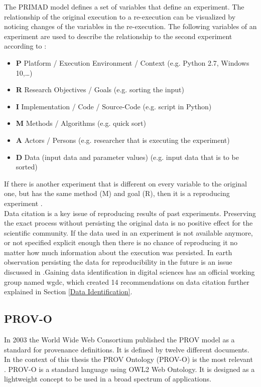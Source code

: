 \documentclass[draft,final]{vutinfth} %
\begin{document}
The PRIMAD model defines a set of variables that define an experiment. The relationship of the original execution to a re-execution can be visualized by noticing changes of the variables in the re-execution. The following variables of an experiment are used to describe the relationship to the second experiment according to \cite{primad}:

\begin{itemize}
	\item \textbf{P} Platform / Execution Environment / Context (e.g. Python 2.7, Windows 10,\dots) \\
	\item \textbf{R} Research Objectives / Goals (e.g. sorting the input) \\
	\item \textbf{I} Implementation / Code / Source-Code (e.g. script in Python) \\
	\item \textbf{M} Methods / Algorithms (e.g. quick sort) \\
	\item \textbf{A} Actors / Persons (e.g. researcher that is executing the experiment) \\
	\item \textbf{D} Data (input data and parameter values)   (e.g. input data that is to be sorted) 
\end{itemize}
If there is another experiment that is different on every variable to the original one, but has the same method (M) and goal (R), then it is a reproducing experiment \cite{primad}. 
\\  
Data citation is a key issue of reproducing results of past experiments. Preserving the exact process without persisting the original data is no positive effect for the scientific community. If the data used in an experiment is not available anymore, or not specified explicit enough then there is no chance of reproducing it no matter how much information about the execution was persisted. In earth observation persisting the data for reproducibility in the future is an issue discussed in \cite{6352411}.Gaining data identification in digital sciences has an official working group named \gls{wgdc}, which created 14 recommendations on data citation further explained in Section \ref{Data Identification}.

 \subsection{PROV-O}\label{PROV}
In 2003 the World Wide Web Consortium published the PROV model as a standard for provenance definitions. It is defined by twelve different documents. In the context of this thesis the PROV Ontology (PROV-O) is the most relevant \cite{733f89c65e4844f9aabcae1c276a5602}. 
PROV-O is a standard language using OWL2 Web Ontology. It is designed as a lightweight concept to be used in a broad spectrum of applications. 
\end{document}
